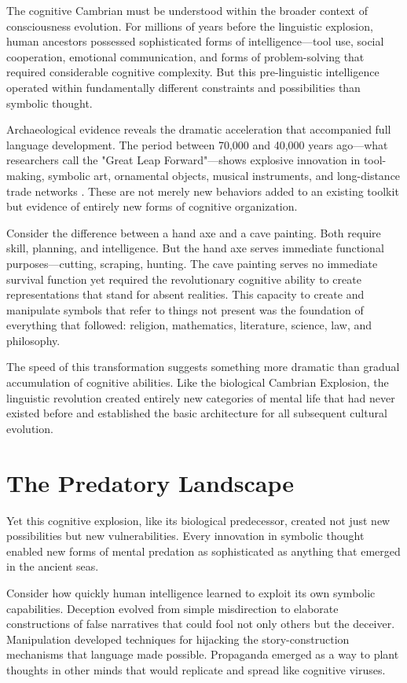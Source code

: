 The cognitive Cambrian must be understood within the broader context of consciousness evolution. For millions of years before the linguistic explosion, human ancestors possessed sophisticated forms of intelligence—tool use, social cooperation, emotional communication, and forms of problem-solving that required considerable cognitive complexity. But this pre-linguistic intelligence operated within fundamentally different constraints and possibilities than symbolic thought.

Archaeological evidence reveals the dramatic acceleration that accompanied full language development. The period between 70,000 and 40,000 years ago—what researchers call the "Great Leap Forward"—shows explosive innovation in tool-making, symbolic art, ornamental objects, musical instruments, and long-distance trade networks \parencite{mellars2007neanderthal,klein2009birth}. These are not merely new behaviors added to an existing toolkit but evidence of entirely new forms of cognitive organization.

Consider the difference between a hand axe and a cave painting. Both require skill, planning, and intelligence. But the hand axe serves immediate functional purposes—cutting, scraping, hunting. The cave painting serves no immediate survival function yet required the revolutionary cognitive ability to create representations that stand for absent realities. This capacity to create and manipulate symbols that refer to things not present was the foundation of everything that followed: religion, mathematics, literature, science, law, and philosophy.

The speed of this transformation suggests something more dramatic than gradual accumulation of cognitive abilities. Like the biological Cambrian Explosion, the linguistic revolution created entirely new categories of mental life that had never existed before and established the basic architecture for all subsequent cultural evolution.

\section{The Predatory Landscape}

Yet this cognitive explosion, like its biological predecessor, created not just new possibilities but new vulnerabilities. Every innovation in symbolic thought enabled new forms of mental predation as sophisticated as anything that emerged in the ancient seas.

Consider how quickly human intelligence learned to exploit its own symbolic capabilities. Deception evolved from simple misdirection to elaborate constructions of false narratives that could fool not only others but the deceiver. Manipulation developed techniques for hijacking the story-construction mechanisms that language made possible. Propaganda emerged as a way to plant thoughts in other minds that would replicate and spread like cognitive viruses.

